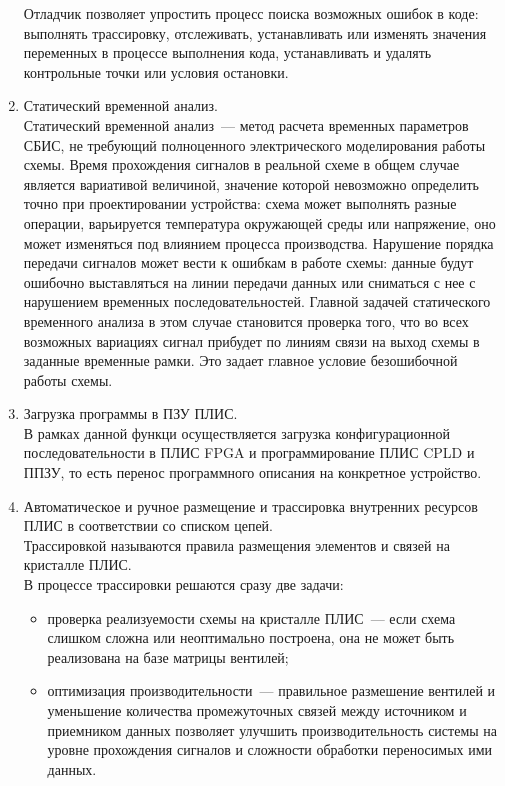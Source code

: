 \begin{enumerate}
  Отладчик позволяет упростить процесс поиска возможных ошибок в коде: выполнять трассировку, отслеживать, устанавливать или изменять значения переменных в процессе выполнения кода, устанавливать и удалять контрольные точки или условия остановки.
  \item Статический временной анализ.\\
  Статический временной анализ~--- метод расчета временных параметров СБИС, не требующий полноценного электрического моделирования работы схемы.
  Время прохождения сигналов в реальной схеме в общем случае является вариативой величиной, значение которой невозможно определить точно при проектировании устройства: схема может выполнять разные операции, варьируется температура окружающей среды или напряжение, оно может изменяться под влиянием процесса производства.
  Нарушение порядка передачи сигналов может вести к ошибкам в работе схемы: данные будут ошибочно выставляться на линии передачи данных или сниматься с нее с нарушением временных последовательностей.
  Главной задачей статического временного анализа в этом случае становится проверка того, что во всех возможных вариациях сигнал прибудет по линиям связи на выход схемы в заданные временные рамки.
  Это задает главное условие безошибочной работы схемы.
  \item Загрузка программы в ПЗУ ПЛИС.\\
  В рамках данной функци осуществляется загрузка конфигурационной последовательности в ПЛИС FPGA и программирование ПЛИС CPLD и ППЗУ, то есть перенос программного описания на конкретное устройство.
  \item Автоматическое и ручное размещение и трассировка внутренних ресурсов ПЛИС в соответствии со списком цепей.\\
  Трассировкой называются правила размещения элементов и связей на кристалле ПЛИС.\\
  В процессе трассировки решаются сразу две задачи:
  \begin{itemize}[leftmargin=*]
    \item проверка реализуемости схемы на кристалле ПЛИС~--- если схема слишком сложна или неоптимально построена, она не может быть реализована на базе матрицы вентилей;
    \item оптимизация производительности~--- правильное размешение вентилей и уменьшение количества промежуточных связей между источником и приемником данных позволяет улучшить производительность системы на уровне прохождения сигналов и сложности обработки переносимых ими данных.
  \end{itemize}

\end{enumerate}
